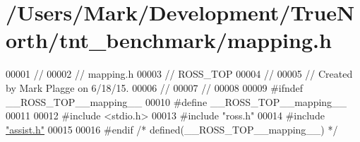 \hypertarget{mapping_8h_source}{}\section{/\+Users/\+Mark/\+Development/\+True\+North/tnt\+\_\+benchmark/mapping.h}

\begin{DoxyCode}
00001 \textcolor{comment}{//}
00002 \textcolor{comment}{//  mapping.h}
00003 \textcolor{comment}{//  ROSS\_TOP}
00004 \textcolor{comment}{//}
00005 \textcolor{comment}{//  Created by Mark Plagge on 6/18/15.}
00006 \textcolor{comment}{//}
00007 \textcolor{comment}{//}
00008 
00009 \textcolor{preprocessor}{#}\textcolor{preprocessor}{ifndef} \textcolor{preprocessor}{\_\_ROSS\_TOP\_\_mapping\_\_}
00010 \textcolor{preprocessor}{#}\textcolor{preprocessor}{define} \textcolor{preprocessor}{\_\_ROSS\_TOP\_\_mapping\_\_}
00011 
00012 \textcolor{preprocessor}{#}\textcolor{preprocessor}{include} \textcolor{preprocessor}{<}\textcolor{preprocessor}{stdio}\textcolor{preprocessor}{.}\textcolor{preprocessor}{h}\textcolor{preprocessor}{>}
00013 \textcolor{preprocessor}{#}\textcolor{preprocessor}{include} \textcolor{preprocessor}{"ross.h"}
00014 \textcolor{preprocessor}{#}\textcolor{preprocessor}{include} \hyperlink{assist_8h}{"assist.h"}
00015 
00016 \textcolor{preprocessor}{#}\textcolor{preprocessor}{endif} \textcolor{comment}{/* defined(\_\_ROSS\_TOP\_\_mapping\_\_) */}
\end{DoxyCode}
